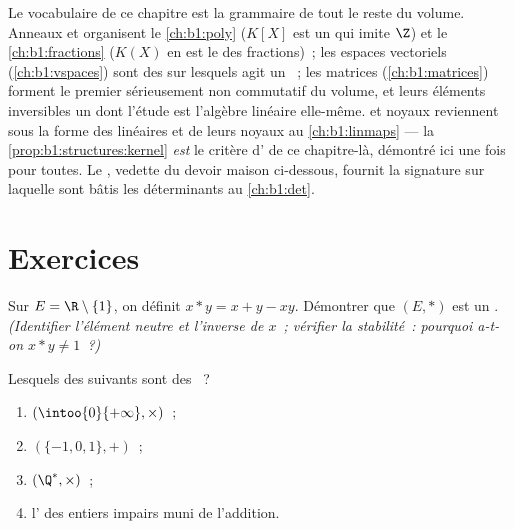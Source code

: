 \begin{remark}\label{rem:b1:structures:whereused}
Le vocabulaire de ce chapitre est la grammaire de tout le reste du
volume. Anneaux et  organisent le \cref{ch:b1:poly} ($K[X]$ est
un  qui imite $\Z$) et le \cref{ch:b1:fractions} ($K(X)$ en est
le  des fractions)~; les espaces vectoriels
(\cref{ch:b1:vspaces}) sont des  sur lesquels agit un
~; les matrices (\cref{ch:b1:matrices}) forment le premier 
sérieusement non commutatif du volume, et leurs éléments inversibles
un  dont l'étude est l'algèbre linéaire elle-même.  et
noyaux reviennent sous la forme des  linéaires et de leurs
noyaux au \cref{ch:b1:linmaps} --- la \cref{prop:b1:structures:kernel}
\emph{est} le critère d' de ce chapitre-là, démontré ici
une fois pour toutes. Le , vedette du devoir maison
ci-dessous, fournit la signature sur laquelle sont bâtis les
déterminants au \cref{ch:b1:det}.
\end{remark}

\section{Exercices}

\begin{exercise}[$\star$]\label{exo:b1:structures:1}
Sur $E = \R \setminus \{1\}$, on définit $x * y = x + y - xy$. Démontrer
que $(E, *)$ est un . \emph{(Identifier l'élément neutre
et l'inverse de $x$~; vérifier la stabilité~: pourquoi a-t-on
$x * y \neq 1$~?)}
\end{exercise}

\begin{exercise}[$\star$]\label{exo:b1:structures:2}
Lesquels des  suivants sont des ~?
\begin{enumerate}
  \item $(\intoo{0}{+\infty}, \times)$~;
  \item $(\{-1, 0, 1\}, +)$~;
  \item $(\Q^*, \times)$~;
  \item l' des entiers impairs muni de l'addition.
\end{enumerate}
\end{exercise}

